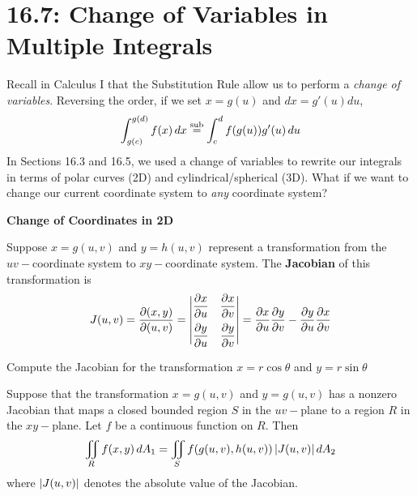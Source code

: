 \documentclass[../mathNotesPreamble]{subfiles}
\begin{document}
\section{16.7: Change of Variables in Multiple Integrals}

  \noindent
  Recall in Calculus I that the Substitution Rule allow us to perform a \textit{change of variables}. Reversing the order, if we set $x=g(u)$ and $dx=g'(u)du$,
    \[
      \int_{g(c)}^{g(d)} f{\left(x\right)}\,dx\overset{\text{sub}}{=}\int_{c}^{d}f{\left(g(u)\right)}g'(u)\,du
    \]
  \noindent
  In Sections 16.3 and 16.5, we used a change of variables to rewrite our integrals in terms of polar curves (2D) and cylindrical/spherical (3D). What if we want to change our current coordinate system to \textit{any} coordinate system?
  \vspace{\baselineskip}

  \noindent
  \textbf{Change of Coordinates in 2D}
  \begin{defn*}[Jacobian]
    Suppose $x=g(u,v)$ and $y=h(u,v)$ represent a transformation from the $uv-$coordinate system to $xy-$coordinate system. The \textbf{Jacobian} of this transformation is 
      \[
        J(u,v)=\dfrac{\partial{\left(x,y\right)}}{\partial{\left(u,v\right)}}=
        \begin{vmatrix}
          \dfrac{\partial x}{\partial u}&\dfrac{\partial x}{\partial v}\\[2ex]
          \dfrac{\partial y}{\partial u}&\dfrac{\partial y}{\partial v}
        \end{vmatrix}
        =\dfrac{\partial x}{\partial u}\dfrac{\partial y}{\partial v}-\dfrac{\partial y}{\partial u}\dfrac{\partial x}{\partial v}
      \]
  \end{defn*}

  \begin{ex*}
    Compute the Jacobian for the transformation $x=r\cos\theta$ and $y=r\sin\theta$
  \end{ex*}
  \pagebreak

  \begin{thmBox*}
    Suppose that the transformation $x=g(u,v)$ and $y=g(u,v)$ has a nonzero Jacobian that maps a closed bounded region $S$ in the $uv-$plane to a region $R$ in the $xy-$plane. Let $f$ be a continuous function on $R$. Then
      \[
        \iint\limits_R f(x,y)\,dA_1=\iint\limits_S f{\left(g(u,v),h(u,v)\right)}
        \,{\left\vert J(u,v)\right\vert}\,dA_2
      \]
    where ${\left\vert J(u,v)\right\vert}$ denotes the absolute value of the Jacobian.
  \end{thmBox*}
\end{document}
